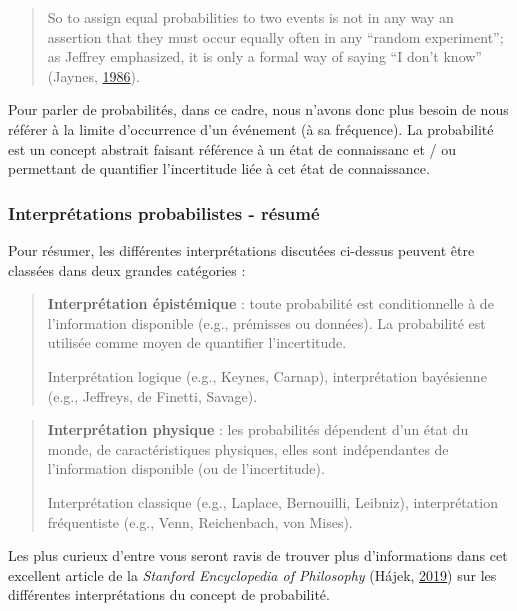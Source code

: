 \documentclass[
  a4paper,11pt,twoside,onecolumn,openright,final,oldfontcommands]{memoir}
\theoremstyle{definition}
\theoremstyle{definition}
\theoremstyle{definition}
\theoremstyle{remark}
\begin{document}
\begin{quote}
So to assign equal probabilities to two events is not in any way an assertion that they must occur equally often in any ``random experiment''; as Jeffrey emphasized, it is only a formal way of saying ``I don't know'' (Jaynes, \protect\hyperlink{ref-jaynes_bayesian_1986}{1986}).
\end{quote}

Pour parler de probabilités, dans ce cadre, nous n'avons donc plus besoin de nous référer à la limite d'occurrence d'un événement (à sa fréquence). La probabilité est un concept abstrait faisant référence à un état de connaissanc et / ou permettant de quantifier l'incertitude liée à cet état de connaissance.

\hypertarget{interpruxe9tations-probabilistes---ruxe9sumuxe9}{%
\subsubsection{Interprétations probabilistes - résumé}\label{interpruxe9tations-probabilistes---ruxe9sumuxe9}}

Pour résumer, les différentes interprétations discutées ci-dessus peuvent être classées dans deux grandes catégories :

\begin{quote}
\textbf{Interprétation épistémique} : toute probabilité est conditionnelle à de l'information disponible (e.g., prémisses ou données). La probabilité est utilisée comme moyen de quantifier l'incertitude.

Interprétation logique (e.g., Keynes, Carnap), interprétation bayésienne (e.g., Jeffreys, de Finetti, Savage).
\end{quote}

\begin{quote}
\textbf{Interprétation physique} : les probabilités dépendent d'un état du monde, de caractéristiques physiques, elles sont indépendantes de l'information disponible (ou de l'incertitude).

Interprétation classique (e.g., Laplace, Bernouilli, Leibniz), interprétation fréquentiste (e.g., Venn, Reichenbach, von Mises).
\end{quote}

Les plus curieux d'entre vous seront ravis de trouver plus d'informations dans cet excellent article de la \emph{Stanford Encyclopedia of Philosophy} (Hájek, \protect\hyperlink{ref-sep-probability-interpret}{2019}) sur les différentes interprétations du concept de probabilité.
\end{document}
